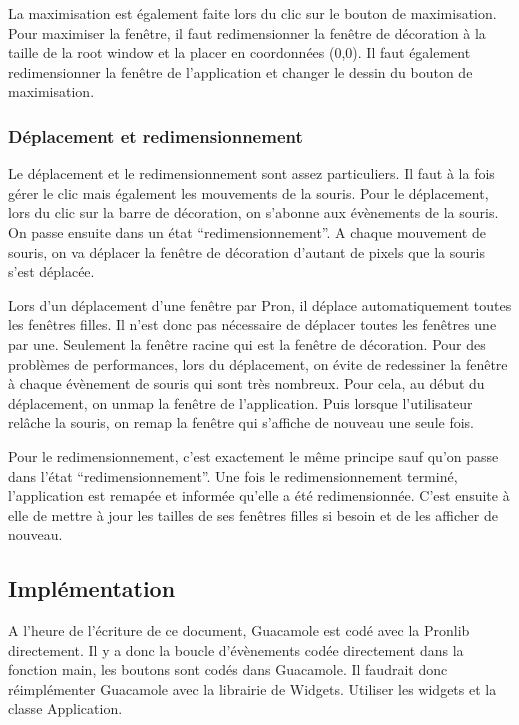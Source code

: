 La maximisation est également faite lors du clic sur le bouton de maximisation.
Pour maximiser la fenêtre, il faut redimensionner la fenêtre de décoration à la taille de la root window et la placer en coordonnées (0,0).
Il faut également redimensionner la fenêtre de l'application et changer le dessin du bouton de maximisation.

\subsubsection{Déplacement et redimensionnement}

Le déplacement et le redimensionnement sont assez particuliers.
Il faut à la fois gérer le clic mais également les mouvements de la souris.
Pour le déplacement, lors du clic sur la barre de décoration, on s'abonne aux évènements de la souris.
On passe ensuite dans un état ``redimensionnement''.
A chaque mouvement de souris, on va déplacer la fenêtre de décoration d'autant de pixels que la souris s'est déplacée.

Lors d'un déplacement d'une fenêtre par Pron, il déplace automatiquement toutes les fenêtres filles.
Il n'est donc pas nécessaire de déplacer toutes les fenêtres une par une.
Seulement la fenêtre racine qui est la fenêtre de décoration.
Pour des problèmes de performances, lors du déplacement, on évite de redessiner la fenêtre à chaque évènement de souris qui sont très nombreux.
Pour cela, au début du déplacement, on unmap la fenêtre de l'application.
Puis lorsque l'utilisateur relâche la souris, on remap la fenêtre qui s'affiche de nouveau une seule fois.

Pour le redimensionnement, c'est exactement le même principe sauf qu'on passe dans l'état ``redimensionnement''.
Une fois le redimensionnement terminé, l'application est remapée et informée qu'elle a été redimensionnée.
C'est ensuite à elle de mettre à jour les tailles de ses fenêtres filles si besoin et de les afficher de nouveau.



\subsection{Implémentation}

A l'heure de l'écriture de ce document, Guacamole est codé avec la Pronlib directement.
Il y a donc la boucle d'évènements codée directement dans la fonction main, les boutons sont codés dans Guacamole.
Il faudrait donc réimplémenter Guacamole avec la librairie de Widgets.
Utiliser les widgets et la classe Application.